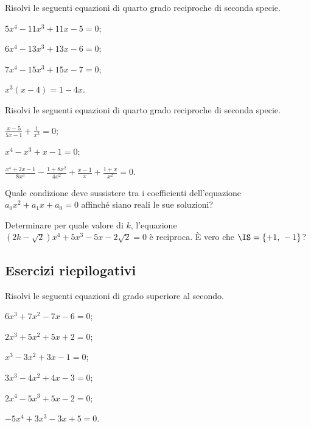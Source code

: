 \begin{esercizio}[\Ast]
 \label{ese:5.48}
Risolvi le seguenti equazioni di quarto grado reciproche di seconda specie.
\begin{multicols}{2}
\begin{enumeratea}
\item $5x^4-11x^3+11x-5=0$;
\item $6x^4-13x^3+13x-6=0$;
\item $7x^4-15x^3+15x-7=0$;
\item $x^3(x-4)=1-4x$.
\end{enumeratea}
\end{multicols}
\end{esercizio}

\begin{esercizio}[\Ast]
 \label{ese:5.49}
Risolvi le seguenti equazioni di quarto grado reciproche di seconda specie.
\begin{multicols}{2}
\begin{enumeratea}
\item $\frac{x-5}{5x-1}+\frac 1{x^3}=0$;
\item $x^4-x^3+x-1=0$;
\item $\frac{x^4+2x-1}{8x^3}-\frac{1+8x^2}{4x^2}+\frac{x-1} x+\frac{1+x}{x^2}=0$.
\end{enumeratea}
\end{multicols}
\end{esercizio}

\begin{esercizio}
 \label{ese:5.50}
Quale condizione deve sussistere tra i coefficienti dell'equazione $a_0x^2+a_1x+a_0=0$ affinché siano reali le sue soluzioni?
\end{esercizio}

\begin{esercizio}[\Ast]
 \label{ese:5.51}
Determinare per quale valore di $k$, l'equazione $\left(2k-\sqrt 2\right)x^4+5x^3-5x-2\sqrt 2=0$ è reciproca. È vero che $\IS=\{+1\text{, }-1\}$?
\end{esercizio}
\pagebreak
\subsection{Esercizi riepilogativi}

\begin{esercizio}[\Ast] %
Risolvi le seguenti equazioni di grado superiore al secondo.
\begin{multicols}{2}
\begin{enumeratea}
\item $6x^3+7x^2-7x-6=0$;
\item $2x^3+5x^2+5x+2=0$;
\item $x^3-3x^2+3x-1=0$;
\item $3x^3-4x^2+4x-3=0$;
\item $2x^4-5x^3+5x-2=0$;
\item $-5x^4+3x^3-3x+5=0$.
\end{enumeratea}
\end{multicols}
\end{esercizio}

